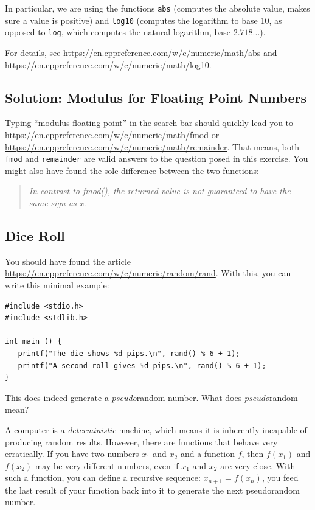 In particular, we are using the functions \texttt{abs} (computes the absolute value, \ie makes sure a value is positive) and \texttt{log10} (computes the logarithm to base 10, as opposed to \texttt{log}, which computes the natural logarithm, base $2.718...$).

For details, see \url{https://en.cppreference.com/w/c/numeric/math/abs} and \url{https://en.cppreference.com/w/c/numeric/math/log10}.

\subsection*{Solution: Modulus for Floating Point Numbers}
Typing \enquote{modulus floating point} in the search bar should quickly lead you to \url{https://en.cppreference.com/w/c/numeric/math/fmod} or \url{https://en.cppreference.com/w/c/numeric/math/remainder}. That means, both \texttt{fmod} and \texttt{remainder} are valid answers to the question posed in this exercise. You might also have found the sole difference between the two functions:
\begin{quote}
\emph{In contrast to fmod(), the returned value is not guaranteed to have the same sign as x.}
\end{quote}

\subsection*{Dice Roll}
You should have found the article \url{https://en.cppreference.com/w/c/numeric/random/rand}. With this, you can write this minimal example:

\begin{codebox}[exo6-3a.c]
\begin{verbatim}
#include <stdio.h>
#include <stdlib.h>

int main () {
   printf("The die shows %d pips.\n", rand() % 6 + 1);
   printf("A second roll gives %d pips.\n", rand() % 6 + 1);
}
\end{verbatim}
\end{codebox}

This does indeed generate a \emph{pseudo}random number. What does \emph{pseudo}random mean?

A computer is a \emph{deterministic} machine, which means it is inherently incapable of producing random results. However, there are functions that behave very erratically. If you have two numbers $x_1$ and $x_2$ and a function $f$, then $f(x_1)$ and $f(x_2)$ may be very different numbers, even if $x_1$ and $x_2$ are very close. With such a function, you can define a recursive sequence: $x_{n+1} = f(x_n)$, \ie you feed the last result of your function back into it to generate the next pseudorandom number.

